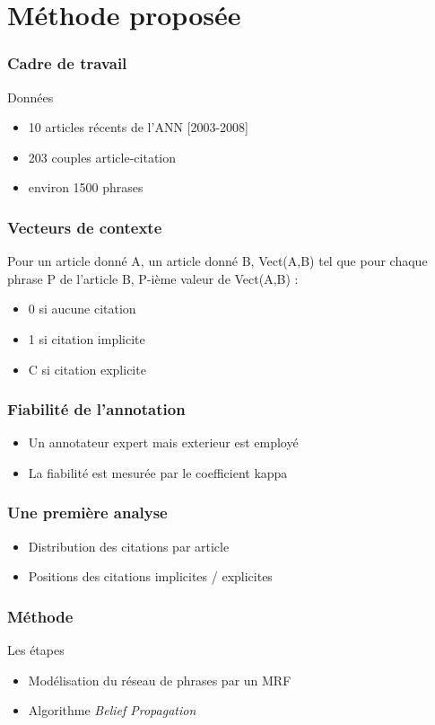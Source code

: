 \documentclass[12pt]{beamer}
\begin{document}
\section{Méthode proposée}


\begin{frame}
  \frametitle{Cadre de travail}
  \begin{block}{Données}
  \begin{itemize}
    \item 10 articles récents de l'ANN [2003-2008]
    \item 203 couples article-citation
    \item environ 1500 phrases
  \end{itemize}
  \end{block}
\end{frame}

\begin{frame}
  \frametitle{Vecteurs de contexte}
  Pour un article donné A, un article donné B,
  Vect(A,B) tel que pour chaque phrase P de l'article B, P-ième valeur de Vect(A,B) :
  \begin{itemize}
    \item 0 si aucune citation
    \item 1 si citation implicite
    \item C si citation explicite
  \end{itemize}
\end{frame}

\begin{frame}
  \frametitle{Fiabilité de l'annotation}
  \begin{itemize}
    \item Un annotateur expert mais exterieur est employé
    \item La fiabilité est mesurée par le coefficient kappa
  \end{itemize}
\end{frame}

\begin{frame}
  \frametitle{Une première analyse}
  \begin{itemize}
    \item Distribution des citations par article
    \item Positions des citations implicites / explicites
  \end{itemize}
\end{frame}

\begin{frame}
  \frametitle{Méthode}
  Les étapes
  \begin{itemize}
    \item Modélisation du réseau de phrases par un MRF
    \item Algorithme \textit{Belief Propagation}
  \end{itemize}
\end{frame}
\end{document}
